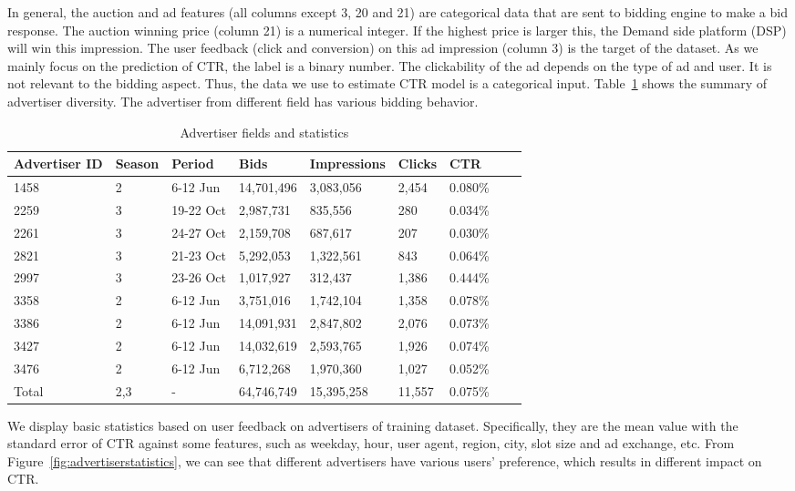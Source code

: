 In general,  the auction and ad features (all columns except 3, 20 and 21) are categorical data that are sent to bidding engine to make a bid response. The auction winning price (column 21) is a numerical integer. If the highest price is larger this, the Demand side platform (DSP) will win this impression. The user feedback (click and conversion) on this ad impression (column 3) is the target of the dataset. As we mainly focus on the prediction of CTR, the label is a binary number. The clickability of the ad depends on the type of ad and user. It is not relevant to the bidding aspect. Thus, the data we use to estimate CTR model is a categorical input. Table~\ref{tab:Advertiser} shows the summary of advertiser diversity. The advertiser from different field has various bidding behavior.

\begin{table}[H]
\caption{Advertiser fields and statistics}
\label{tab:Advertiser}
\begin{center}
\begin{tabular}{ l l l l l l l l l } 
\hline
Advertiser ID & Season & Period & Bids & Impressions & Clicks & CTR \\
\hline
1458 & 2 & 6-12 Jun & 14,701,496 & 3,083,056 & 2,454 & 0.080\% \\
2259 & 3 & 19-22 Oct & 2,987,731 & 835,556 & 280 & 0.034\% \\
2261 & 3 & 24-27 Oct & 2,159,708 & 687,617 & 207 & 0.030\% \\
2821 & 3 & 21-23 Oct & 5,292,053 & 1,322,561 & 843 & 0.064\% \\
2997 & 3 & 23-26 Oct & 1,017,927 & 312,437 & 1,386 & 0.444\% \\
3358 & 2 & 6-12 Jun & 3,751,016 & 1,742,104 & 1,358 & 0.078\% \\
3386 & 2 & 6-12 Jun & 14,091,931 & 2,847,802 & 2,076 & 0.073\% \\
3427 & 2 & 6-12 Jun & 14,032,619 & 2,593,765 & 1,926 & 0.074\% \\
3476 & 2 & 6-12 Jun & 6,712,268 & 1,970,360 & 1,027 & 0.052\% \\
Total & 2,3 & - & 64,746,749 & 15,395,258 & 11,557 & 0.075\% \\
\hline
\end{tabular}
\end{center}
\end {table}

We display basic statistics based on user feedback on advertisers of training dataset. Specifically, they are the mean value with the standard error of CTR against some features, such as weekday, hour, user agent, region, city, slot size and ad exchange, etc. From Figure~\ref{fig:advertiserstatistics}, we can see that different advertisers have various users' preference, which results in different impact on CTR.

